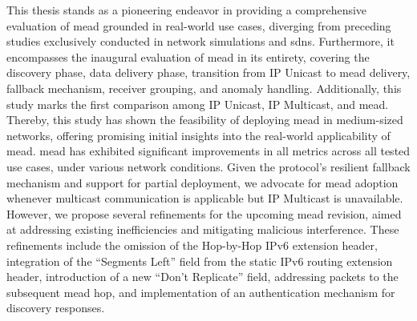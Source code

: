 This thesis stands as a pioneering endeavor in providing a comprehensive
    evaluation of \gls{mead} grounded in real-world use cases, diverging from 
    preceding studies exclusively conducted in network simulations and
    \glspl{sdn}.
Furthermore, it encompasses the inaugural evaluation of \gls{mead} in its
    entirety, covering the discovery phase, data delivery phase, transition
    from IP Unicast to \gls{mead} delivery, fallback mechanism, receiver
    grouping, and anomaly handling.
Additionally, this study marks the first comparison among IP Unicast, IP
    Multicast, and \gls{mead}.
Thereby, this study has shown the feasibility of deploying \gls{mead} in
    medium-sized networks, offering promising initial insights into the
    real-world applicability of \gls{mead}.
\gls{mead} has exhibited significant improvements in all metrics across
    all tested use cases, under various network conditions.
Given the protocol's resilient fallback mechanism and support for partial
    deployment, we advocate for \gls{mead} adoption whenever multicast
    communication is applicable but IP Multicast is unavailable.
However, we propose several refinements for the upcoming \gls{mead}
    revision, aimed at addressing existing inefficiencies and mitigating
    malicious interference.
These refinements include the omission of the Hop-by-Hop IPv6 extension header,
    integration of the ``Segments Left'' field from the static IPv6 routing
    extension header, introduction of a new ``Don't Replicate'' field,
    addressing packets to the subsequent \gls{mead} hop, and implementation of
    an authentication mechanism for discovery responses.


